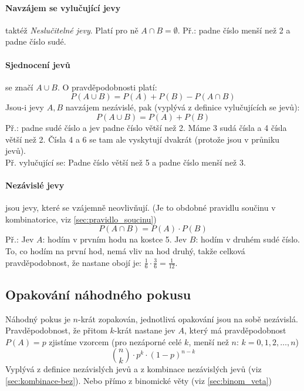 \documentclass[12pt]{article}
\begin{document}
\paragraph{Navzájem se vylučující jevy} taktéž \emph{Neslučitelné jevy}. Platí pro ně $A \cap B = \emptyset$. Př.: padne číslo menší než 2 a padne číslo sudé.
\paragraph{Sjednocení jevů} se značí $A \cup B$. O pravděpodobnosti platí:
\begin{equation}
P(A \cup B) = P(A) + P(B) - P(A \cap B)
\end{equation}
Jsou-i jevy $A,B$ navzájem nezávislé, pak (vyplývá z definice vylučujících se jevů):
\begin{equation}
P(A \cup B) = P(A) + P(B)
\end{equation}
Př.: padne sudé číslo a jev padne číslo větší než 2.  Máme 3 sudá čísla a 4 čísla větší než 2. Čísla 4 a 6 se tam  ale vyskytují dvakrát (protože jsou v průniku jevů).\\
Př. vylučující se: Padne číslo větší než 5 a padne číslo menší než 3.
\paragraph{Nezávislé jevy} jsou jevy, které se vzájemně neovlivňují. (Je to obdobné pravidlu součinu v kombinatorice, viz \ref{sec:pravidlo_soucinu})
\begin{equation}
P(A \cap B) = P(A) \cdot P(B)
\end{equation}
Př.: Jev $A$: hodím v prvním hodu na kostce 5. Jev $B$: hodím v druhém sudé číslo. To, co hodím na první hod, nemá vliv na hod druhý, takže celková pravděpodobnost, že nastane obojí je: $\frac{1}{6} \cdot \frac{3}{6} = \frac{1}{12}$.
\subsection{Opakování náhodného pokusu}
Náhodný pokus je $n$-krát zopakován, jednotlivá opakování jsou na sobě nezávislá. Pravděpodobnost, že přitom $k$-krát nastane jev $A$, který má pravděpodobnost $P(A) =p$ zjistíme vzorcem (pro nezáporné celé $k$, menší než $n$:  $k =0,1,2, \dotsc, n$)
\begin{equation}
\label{eq:binom_rozdeleni}
\binom{n}{k} \cdot p^k \cdot \left( 1-p \right)^{n-k}
\end{equation}
Vyplývá z definice nezávislých jevů a z kombinace nezávislých jevů (viz \ref{sec:kombinace-bez}). Nebo přímo z binomické věty (viz \ref{sec:binom_veta})
\end{document}
